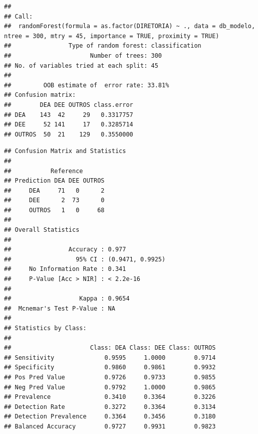 \documentclass[]{article}
\newenvironment{Shaded}{\begin{snugshade}}{\end{snugshade}}
\newcommand{\KeywordTok}[1]{\textcolor[rgb]{0.13,0.29,0.53}{\textbf{#1}}}
\newcommand{\DataTypeTok}[1]{\textcolor[rgb]{0.13,0.29,0.53}{#1}}
\newcommand{\StringTok}[1]{\textcolor[rgb]{0.31,0.60,0.02}{#1}}
\newcommand{\CommentTok}[1]{\textcolor[rgb]{0.56,0.35,0.01}{\textit{#1}}}
\newcommand{\OperatorTok}[1]{\textcolor[rgb]{0.81,0.36,0.00}{\textbf{#1}}}
\newcommand{\NormalTok}[1]{#1}
\begin{document}
\begin{verbatim}
## 
## Call:
##  randomForest(formula = as.factor(DIRETORIA) ~ ., data = db_modelo,      ntree = 300, mtry = 45, importance = TRUE, proximity = TRUE) 
##                Type of random forest: classification
##                      Number of trees: 300
## No. of variables tried at each split: 45
## 
##         OOB estimate of  error rate: 33.81%
## Confusion matrix:
##        DEA DEE OUTROS class.error
## DEA    143  42     29   0.3317757
## DEE     52 141     17   0.3285714
## OUTROS  50  21    129   0.3550000
\end{verbatim}

\begin{Shaded}
\end{Shaded}

\begin{verbatim}
## Confusion Matrix and Statistics
## 
##           Reference
## Prediction DEA DEE OUTROS
##     DEA     71   0      2
##     DEE      2  73      0
##     OUTROS   1   0     68
## 
## Overall Statistics
##                                           
##                Accuracy : 0.977           
##                  95% CI : (0.9471, 0.9925)
##     No Information Rate : 0.341           
##     P-Value [Acc > NIR] : < 2.2e-16       
##                                           
##                   Kappa : 0.9654          
##  Mcnemar's Test P-Value : NA              
## 
## Statistics by Class:
## 
##                      Class: DEA Class: DEE Class: OUTROS
## Sensitivity              0.9595     1.0000        0.9714
## Specificity              0.9860     0.9861        0.9932
## Pos Pred Value           0.9726     0.9733        0.9855
## Neg Pred Value           0.9792     1.0000        0.9865
## Prevalence               0.3410     0.3364        0.3226
## Detection Rate           0.3272     0.3364        0.3134
## Detection Prevalence     0.3364     0.3456        0.3180
## Balanced Accuracy        0.9727     0.9931        0.9823
\end{verbatim}
\end{document}
